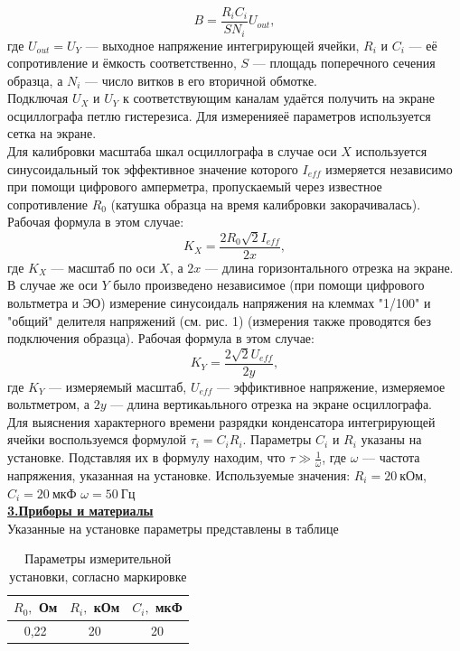 \documentclass[12pt, letterpaper, oneside]{article}
\begin{document}
\begin{equation}\label{Y_formula}
B = \frac{R_i C_i}{S N_i}U_{out},
\end{equation}
где $U_{out} = U_Y$ — выходное напряжение интегрирующей ячейки, $R_i$ и $C_i$ — её сопротивление и ёмкость соответственно, $S$ — площадь поперечного сечения образца, а $N_i$ — число витков в его вторичной обмотке.\\
Подключая $U_X$ и $U_Y$ к соответствующим каналам удаётся получить на экране осциллографа петлю гистерезиса. Для измеренияеё параметров используется сетка на экране.\\
Для калибровки масштаба шкал осциллографа в случае оси $X$ используется синусоидальный ток эффективное значение которого $I_{eff}$ измеряется независимо при помощи цифрового амперметра, пропускаемый через известное сопротивление $R_0$ (катушка образца на время калибровки закорачивалась). Рабочая формула в этом случае:
\begin{equation}\label{K_X_formula}
K_X = \frac{2R_0\sqrt{2}I_{eff}}{2x},
\end{equation}
где $K_X$ — масштаб по оси $X$, а $2x$ — длина горизонтального отрезка на экране.
В случае же оси $Y$ было произведено независимое (при помощи цифрового вольтметра и ЭО) измерение синусоидаль напряжения на клеммах "1/100" и "общий" делителя напряжений (см. рис. 1) (измерения также проводятся без подключения образца). Рабочая формула в этом случае:
\begin{equation}\label{K_Y_formula}
K_Y = \frac{2\sqrt{2}U_{eff}}{2y},
\end{equation}
где $K_Y$ — измеряемый масштаб, $U_{eff}$ — эффиктивное напряжение, измеряемое вольтметром, а $2y$ — длина вертикаьльного отрезка на экране осциллографа.\\
Для выяснения характерного времени разрядки конденсатора интегрирующей ячейки воспользуемся формулой $\tau_i = C_iR_i$. Параметры $C_i$ и $R_i$ указаны на установке. Подставляя их в формулу находим, что $\tau ≫ \frac{1}{\omega}$, где $\omega$ — частота напряжения, указанная на установке. Используемые значения: $R_i = 20\ кОм$, $C_i = 20\ мкФ$ $\omega = 50\ Гц$\\
\textbf{\underline{3.Приборы и материалы}}\\
Указанные на установке параметры представлены в таблице\\
\begin{table}[H]
\centering
\caption{Параметры измерительной установки, согласно маркировке}
\begin{tabular}{|c|c|c|}
\hline
$R_0,$ Ом & $R_i,$ кОм & $C_i,$ мкФ\\
\hline
0,22 & 20 & 20\\
\hline
\end{tabular}
\end{table}\noindent
\end{document}

